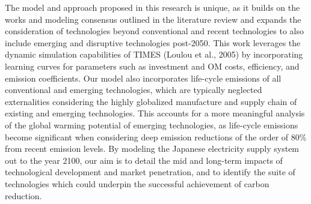 The model and approach proposed in this research is unique, as it builds on the works and modeling consensus outlined in the literature review and expands the consideration of technologies beyond conventional and recent technologies to also include emerging and disruptive technologies post-2050. This work leverages the dynamic simulation capabilities of TIMES (Loulou et al., 2005) by incorporating learning curves for parameters such as investment and \gls{OM} costs, efficiency, and emission coefficients. Our model also incorporates life-cycle emissions of all conventional and emerging technologies, which are typically neglected externalities considering the highly globalized manufacture and supply chain of existing and emerging technologies. This accounts for a more meaningful analysis of the global warming potential of emerging technologies, as life-cycle emissions become significant when considering deep emission reductions of the order of 80\% from recent emission levels. By modeling the Japanese electricity supply system out to the year 2100, our aim is to detail the mid and long-term impacts of technological development and market penetration, and to identify the suite of technologies which could underpin the successful achievement of carbon reduction.
